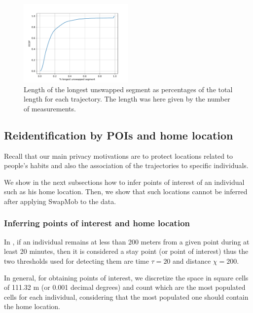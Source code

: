 \documentclass{llncs}
\begin{document}
\begin{figure}
  \center
  \includegraphics[width=0.5\textwidth]{figures/ECDF-max-part.pdf}
  \caption{Length of the longest unswapped segment as percentages of
    the total length for each trajectory. The length was here given by
    the number of measurements.}
  \label{fig:ECDF-max-part}
\end{figure}

\subsection{Reidentification by POIs and home location}
Recall that our main privacy motivations are to protect locations related to people's habits and also the association of the trajectories to specific individuals.

We show in the next subsections how to infer points of interest of an individual such as his home location. Then, we show that such locations cannot be inferred after applying SwapMob to the data.



\subsubsection{Inferring points of interest and home location}
In \cite{Zheng2009}, if an individual remains at less than 200 meters from a given point during at least 20 minutes, then it is considered a stay point (or point of interest) thus the two thresholds used for detecting them are time $\tau = 20$ and distance $\chi = 200$.

In general, for obtaining points of interest, we discretize the space in square cells of 111.32 m (or 0.001 decimal degrees) and count which are the most populated cells for each individual, considering that the most populated one should contain the home location.
\end{document}
